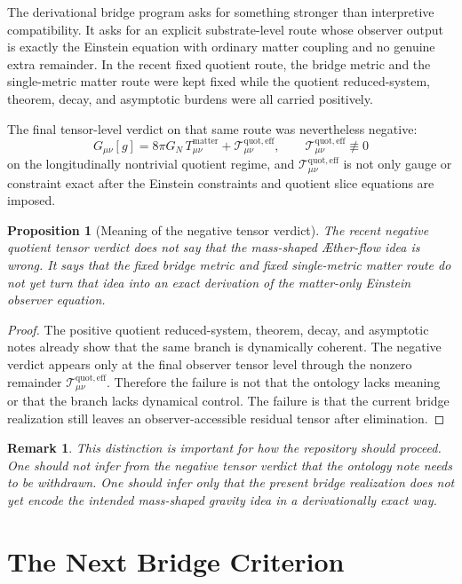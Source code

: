 \documentclass[11pt]{article}
\newcommand{\Aflow}{\AE{}ther-flow}
\newcommand{\EffAux}{\mathcal T_{\mu\nu}^{\mathrm{quot,eff}}}
\newtheorem{proposition}{Proposition}
\newtheorem{remark}{Remark}
\begin{document}
The derivational bridge program asks for something stronger than interpretive compatibility. It asks for an explicit substrate-level route whose observer output is exactly the Einstein equation with ordinary matter coupling and no genuine extra remainder. In the recent fixed quotient route, the bridge metric and the single-metric matter route were kept fixed while the quotient reduced-system, theorem, decay, and asymptotic burdens were all carried positively.

The final tensor-level verdict on that same route was nevertheless negative:
\begin{equation}
G_{\mu\nu}[g]
=
8\pi G_N\,T_{\mu\nu}^{\mathrm{matter}}
+ \EffAux,
\qquad
\EffAux \not\equiv 0
\label{eq:verdict}
\end{equation}
on the longitudinally nontrivial quotient regime, and \(\EffAux\) is not only gauge or constraint exact after the Einstein constraints and quotient slice equations are imposed.

\begin{proposition}[Meaning of the negative tensor verdict]
The recent negative quotient tensor verdict does not say that the mass-shaped \Aflow{} idea is wrong. It says that the fixed bridge metric and fixed single-metric matter route do not yet turn that idea into an exact derivation of the matter-only Einstein observer equation.
\end{proposition}

\begin{proof}
The positive quotient reduced-system, theorem, decay, and asymptotic notes already show that the same branch is dynamically coherent. The negative verdict appears only at the final observer tensor level through the nonzero remainder \(\EffAux\). Therefore the failure is not that the ontology lacks meaning or that the branch lacks dynamical control. The failure is that the current bridge realization still leaves an observer-accessible residual tensor after elimination.
\end{proof}

\begin{remark}
This distinction is important for how the repository should proceed. One should not infer from the negative tensor verdict that the ontology note needs to be withdrawn. One should infer only that the present bridge realization does not yet encode the intended mass-shaped gravity idea in a derivationally exact way.
\end{remark}

\section{The Next Bridge Criterion}
\end{document}
